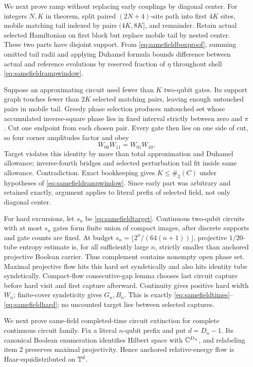 We next prove ramp without replacing early couplings by diagonal center.
For integers $N,K$ in theorem, split paired $(2N+4)$-site path into first
$4K$ sites, mobile matching tail indexed by pairs $(4K,8K]$, and remainder.
Retain actual selected Hamiltonian on first block but replace mobile tail by
nested center.  These two parts have disjoint support.  From
\eqref{eq:samefieldboxproof}, summing omitted tail radii and applying Duhamel
formula bounds difference between actual and reference evolutions by reserved
fraction of $\eta$ throughout shell
\eqref{eq:samefieldrampwindow}.

Suppose an approximating circuit used fewer than $K$ two-qubit gates.  Its
support graph touches fewer than $2K$ selected matching pairs, leaving enough
untouched pairs in mobile tail.  Greedy phase selection produces untouched
set whose accumulated inverse-square phase lies in fixed interval strictly
between zero and $\pi$.  Cut one endpoint from each chosen pair.  Every gate
then lies on one side of cut, so four corner amplitudes factor and obey
\[
 W_{00}W_{11}=W_{01}W_{10}.
\]
Target violates this identity by more than total approximation and Duhamel
allowance; inverse-fourth bridges and selected perturbation tail fit inside
same allowance.  Contradiction.  Exact bookkeeping gives
$K\le\#_2(C)$ under hypotheses of \eqref{eq:samefieldrampwindow}.  Since early
part was arbitrary and retained exactly, argument applies to literal prefix
of selected field, not only diagonal center.

For hard excursions, let $s_n$ be \eqref{eq:samefieldtarget}.  Continuous
two-qubit circuits with at most $s_n$ gates form finite union of compact
images, after discrete supports and gate counts are fixed.  At budget
$s_n=\lfloor2^n/(64(n+1))\rfloor$, projective $1/20$-tube entropy estimate is,
for all sufficiently large $n$, strictly smaller than
anchored projective Boolean carrier.  Thus complement contains nonempty open
phase set.  Maximal projective flow hits this hard set syndetically and also
hits identity tube syndetically.  Compact-flow consecutive-gap lemma chooses
last circuit capture before hard visit and first capture afterward.  Continuity
gives positive hard width $W_n$; finite-cover syndeticity gives $G_n,B_n$.
This is exactly \eqref{eq:samefieldtimes}--\eqref{eq:samefieldhard}; no
uncounted target lies between selected captures.

We next prove same-field completed-time circuit extinction for complete
continuous circuit family.  Fix a literal $n$-qubit prefix and put
$d=D_n-1$.  Its canonical Boolean enumeration identifies Hilbert space with
$\mathbb C^{D_n}$, and relabeling item 2 preserves maximal projectivity.  Hence
anchored relative-energy flow is Haar-equidistributed on $\mathbb T^d$.

